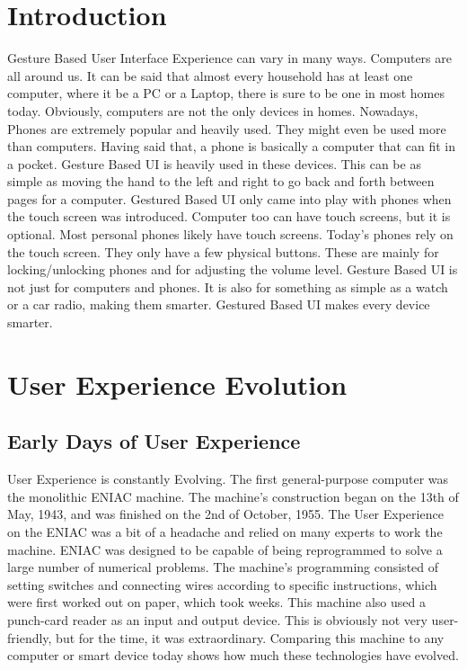\documentclass{article}
\begin{document}
\section{Introduction}
Gesture Based User Interface Experience can vary in many ways. Computers are all around us. It can be said that almost every household has at least one computer, where it be a PC or a Laptop, there is sure to be one in most homes today. Obviously, computers are not the only devices in homes. Nowadays, Phones are extremely popular and heavily used. They might even be used more than computers. Having said that, a phone is basically a computer that can fit in a pocket. Gesture Based UI is heavily used in these devices. This can be as simple as moving the hand to the left and right to go back and forth between pages for a computer. Gestured Based UI only came into play with phones when the touch screen was introduced. Computer too can have touch screens, but it is optional. Most personal phones likely have touch screens. Today’s phones rely on the touch screen. They only have a few physical buttons. These are mainly for locking/unlocking phones and for adjusting the volume level. Gesture Based UI is not just for computers and phones. It is also for something as simple as a watch or a car radio, making them smarter. Gestured Based UI makes every device smarter.

\section{User Experience Evolution}

\subsection{Early Days of User Experience}
User Experience is constantly Evolving. The first general-purpose computer was the monolithic ENIAC machine. The machine’s construction began on the 13th of May, 1943, and was finished on the 2nd of October, 1955. The User Experience on the ENIAC was a bit of a headache and relied on many experts to work the machine. ENIAC was designed to be capable of being reprogrammed to solve a large number of numerical problems. The machine’s programming consisted of setting switches and connecting wires according to specific instructions, which were first worked out on paper, which took weeks. This machine also used a punch-card reader as an input and output device. This is obviously not very user-friendly, but for the time, it was extraordinary. Comparing this machine to any computer or smart device today shows how much these technologies have evolved.
\cite{ref1}
\end{document}
